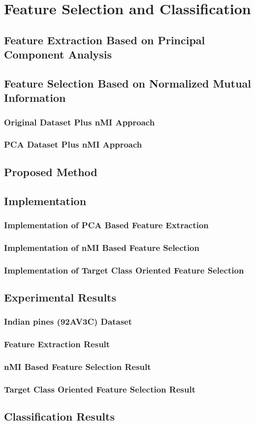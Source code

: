 \documentclass[document.tex]{subfiles}
\begin{document}
\chapter{Feature Selection and Classification}

\section{Feature Extraction Based on Principal Component Analysis}

\section{Feature Selection Based on Normalized Mutual Information}

\subsection{Original Dataset Plus nMI Approach}
\subsection{PCA Dataset Plus nMI Approach}

\section{Proposed Method}

\section{Implementation}

\subsection{Implementation of PCA Based Feature Extraction}
\subsection{Implementation of nMI Based Feature Selection}
\subsection{Implementation of Target Class Oriented Feature Selection}

\section{Experimental Results}

\subsection{Indian pines (92AV3C) Dataset}
\subsection{Feature Extraction Result}
\subsection{nMI Based Feature Selection Result}
\subsection{Target Class Oriented Feature Selection Result}
\section{Classification Results}
\end{document}
